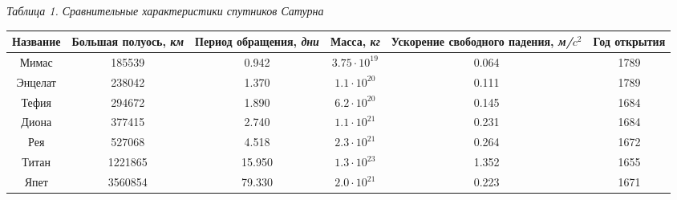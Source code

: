 \documentclass{article}
\begin{document}
    \begin{flushright}
        \textit{Таблица 1. Сравнительные характеристики спутников Сатурна}
    \end{flushright}
    
    \begin{center}
        \begin{tabularx}{1\textwidth}{|C{0.15}|C{0.15}|C{0.15}|C{0.15}|C{0.2}|C{0.15}|}
            \hline
    	    Название & Большая полуось, \textit{км} & Период обращения, \textit{дни} & Масса, \textit{кг} & Ускорение свободного падения, \textit{м/$c^2$} & Год открытия\\
            \hline
            Мимас & 185539 & 0.942 & $3.75 \cdot 10^{19}$ & 0.064 & 1789\\
            \hline
            Энцелат & 238042 & 1.370 & $1.1 \cdot 10^{20}$ & 0.111 & 1789\\
            \hline
            Тефия & 294672 & 1.890 & $6.2 \cdot 10^{20}$ & 0.145 & 1684\\
            \hline
            Диона & 377415 & 2.740 & $1.1 \cdot 10^{21}$ & 0.231 & 1684\\
            \hline
            Рея & 527068 & 4.518 & $2.3 \cdot 10^{21}$ & 0.264 & 1672\\
            \hline
            Титан & 1221865 & 15.950 & $1.3 \cdot 10^{23}$ & 1.352 & 1655\\
            \hline
            Япет & 3560854 & 79.330 & $2.0 \cdot 10^{21}$ & 0.223 & 1671\\
            \hline
        \end{tabularx}
    \end{center}
\end{document}
